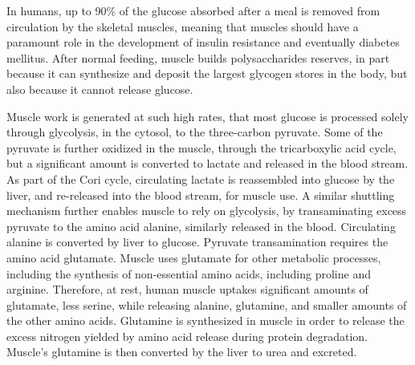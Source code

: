 \documentclass[12pt,english]{report}\usepackage[]{graphicx}\usepackage[]{color}
\begin{document}
In humans, up to 90\% of the glucose absorbed after a meal is removed
from circulation by the skeletal muscles\citep{defronzo1981effect,katz1983splanchnic},
meaning that muscles should have a paramount role in the development
of insulin resistance and eventually diabetes mellitus. After normal
feeding, muscle builds polysaccharides reserves, in part because it
can synthesize and deposit the largest glycogen stores in the body,
but also because it cannot release glucose. 

Muscle work is generated at such high rates, that most glucose is
processed solely through glycolysis, in the cytosol, to the three-carbon
pyruvate. Some of the pyruvate is further oxidized in the muscle,
through the tricarboxylic acid cycle, but a significant amount is
converted to lactate and released in the blood stream. As part of
the Cori cycle, circulating lactate is reassembled into glucose by
the liver, and re-released into the blood stream, for muscle use.
A similar shuttling mechanism further enables muscle to rely on glycolysis,
by transaminating excess pyruvate to the amino acid alanine, similarly
released in the blood. Circulating alanine is converted by liver to
glucose. Pyruvate transamination requires the amino acid glutamate.
Muscle uses glutamate for other metabolic processes, including the
synthesis of non-essential amino acids, including proline and arginine.
Therefore, at rest, human muscle uptakes significant amounts of glutamate,
less serine, while releasing alanine, glutamine, and smaller amounts
of the other amino acids\citep{gelfand1986removal}. Glutamine is
synthesized in muscle in order to release the excess nitrogen yielded
by amino acid release during protein degradation. Muscle's glutamine
is then converted by the liver to urea and excreted.
\end{document}
